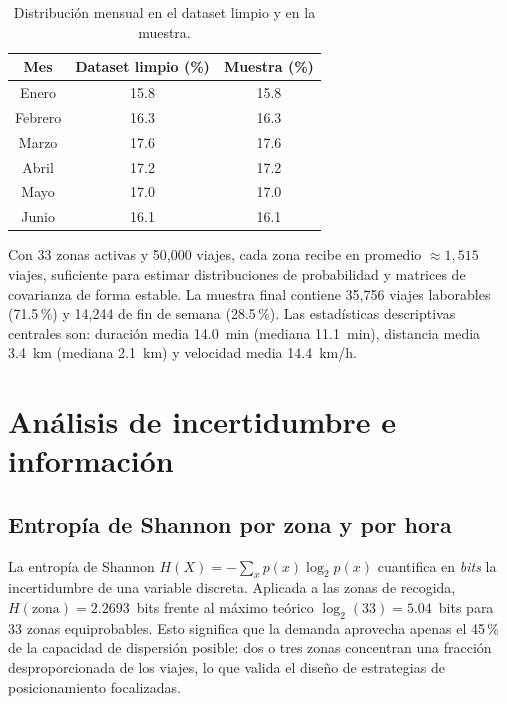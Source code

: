 \documentclass[12pt, a4paper]{article}
\begin{document}
\begin{table}[H]
  \centering
  \caption{Distribución mensual en el dataset limpio y en la muestra.}
  \label{tab:meses}
  \small
  \begin{tabular}{ccc}
    \toprule
    \textbf{Mes} & \textbf{Dataset limpio (\%)} & \textbf{Muestra (\%)} \\
    \midrule
    Enero   & 15{.}8 & 15{.}8 \\
    Febrero & 16{.}3 & 16{.}3 \\
    Marzo   & 17{.}6 & 17{.}6 \\
    Abril   & 17{.}2 & 17{.}2 \\
    Mayo    & 17{.}0 & 17{.}0 \\
    Junio   & 16{.}1 & 16{.}1 \\
    \bottomrule
  \end{tabular}
\end{table}

Con 33 zonas activas y 50{,}000 viajes, cada zona recibe en promedio $\approx 1{,}515$ viajes, suficiente para estimar distribuciones de probabilidad y matrices de covarianza de forma estable. La muestra final contiene 35{,}756 viajes laborables (71{.}5\,\%) y 14{,}244 de fin de semana (28{.}5\,\%). Las estadísticas descriptivas centrales son: duración media 14{.}0~min (mediana 11{.}1~min), distancia media 3{.}4~km (mediana 2{.}1~km) y velocidad media 14{.}4~km/h.

\section{Análisis de incertidumbre e información}
\label{sec:informacion}

\subsection{Entropía de Shannon por zona y por hora}

La entropía de Shannon $H(X) = -\sum_x p(x)\log_2 p(x)$ cuantifica en \emph{bits} la incertidumbre de una variable discreta. Aplicada a las zonas de recogida, $H(\text{zona}) = 2{.}2693$~bits frente al máximo teórico $\log_2(33) = 5{.}04$~bits para 33 zonas equiprobables. Esto significa que la demanda aprovecha apenas el 45\,\% de la capacidad de dispersión posible: dos o tres zonas concentran una fracción desproporcionada de los viajes, lo que valida el diseño de estrategias de posicionamiento focalizadas.
\end{document}
